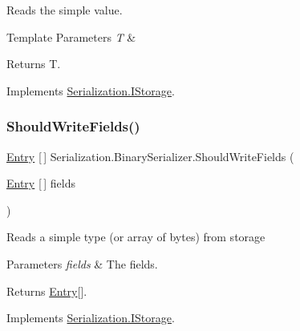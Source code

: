 Reads the simple value. 


\begin{DoxyTemplParams}{Template Parameters}
{\em T} & \\
\hline
\end{DoxyTemplParams}
\begin{DoxyReturn}{Returns}
T.
\end{DoxyReturn}


Implements \hyperlink{interface_serialization_1_1_i_storage_ae1e7a60cc8b12071f1866d2cac454f99}{Serialization.\+I\+Storage}.

\mbox{\label{class_serialization_1_1_binary_serializer_a1813abad4bdfe9607f093e4df66a4414}} 
\subsubsection{\texorpdfstring{Should\+Write\+Fields()}{ShouldWriteFields()}}
{\footnotesize\ttfamily \hyperlink{class_serialization_1_1_entry}{Entry} \mbox{[}$\,$\mbox{]} Serialization.\+Binary\+Serializer.\+Should\+Write\+Fields (\begin{DoxyParamCaption}\item[{\hyperlink{class_serialization_1_1_entry}{Entry} \mbox{[}$\,$\mbox{]}}]{fields }\end{DoxyParamCaption})\hspace{0.3cm}{\ttfamily [inline]}}



Reads a simple type (or array of bytes) from storage 


\begin{DoxyParams}{Parameters}
{\em fields} & The fields.\\
\hline
\end{DoxyParams}
\begin{DoxyReturn}{Returns}
\hyperlink{class_serialization_1_1_entry}{Entry}\mbox{[}\mbox{]}.
\end{DoxyReturn}


Implements \hyperlink{interface_serialization_1_1_i_storage_a0795ec3b6aa77280885c34e2822cb410}{Serialization.\+I\+Storage}.

\mbox{\label{class_serialization_1_1_binary_serializer_adb05a4a6e028617fe748ae28dc97d7c7}} 
